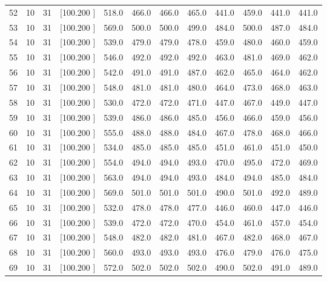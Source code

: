 \documentclass[12pt,a4paper]{article}
\begin{document}
\begin{center}
{\begin{tabular}{r r r r r r r r r r r r}
  52& 10& 31&[100.200   ]&   518.0&   466.0&   466.0&   465.0&   441.0&   459.0&   441.0&   441.0\\[-0.02in]
  53& 10& 31&[100.200   ]&   569.0&   500.0&   500.0&   499.0&   484.0&   500.0&   487.0&   484.0\\[-0.02in]
  54& 10& 31&[100.200   ]&   539.0&   479.0&   479.0&   478.0&   459.0&   480.0&   460.0&   459.0\\[-0.02in]
  55& 10& 31&[100.200   ]&   546.0&   492.0&   492.0&   492.0&   463.0&   481.0&   469.0&   462.0\\[-0.02in]
  56& 10& 31&[100.200   ]&   542.0&   491.0&   491.0&   487.0&   462.0&   465.0&   464.0&   462.0\\[-0.02in]
  57& 10& 31&[100.200   ]&   548.0&   481.0&   481.0&   480.0&   464.0&   473.0&   468.0&   463.0\\[-0.02in]
  58& 10& 31&[100.200   ]&   530.0&   472.0&   472.0&   471.0&   447.0&   467.0&   449.0&   447.0\\[-0.02in]
  59& 10& 31&[100.200   ]&   539.0&   486.0&   486.0&   485.0&   456.0&   466.0&   459.0&   456.0\\[-0.02in]
  60& 10& 31&[100.200   ]&   555.0&   488.0&   488.0&   484.0&   467.0&   478.0&   468.0&   466.0\\[-0.02in]
  61& 10& 31&[100.200   ]&   534.0&   485.0&   485.0&   485.0&   451.0&   461.0&   451.0&   450.0\\[-0.02in]
  62& 10& 31&[100.200   ]&   554.0&   494.0&   494.0&   493.0&   470.0&   495.0&   472.0&   469.0\\[-0.02in]
  63& 10& 31&[100.200   ]&   563.0&   494.0&   494.0&   493.0&   484.0&   494.0&   485.0&   484.0\\[-0.02in]
  64& 10& 31&[100.200   ]&   569.0&   501.0&   501.0&   501.0&   490.0&   501.0&   492.0&   489.0\\[-0.02in]
  65& 10& 31&[100.200   ]&   532.0&   478.0&   478.0&   477.0&   446.0&   460.0&   447.0&   446.0\\[-0.02in]
  66& 10& 31&[100.200   ]&   539.0&   472.0&   472.0&   470.0&   454.0&   461.0&   457.0&   454.0\\[-0.02in]
  67& 10& 31&[100.200   ]&   548.0&   482.0&   482.0&   481.0&   467.0&   482.0&   468.0&   467.0\\[-0.02in]
  68& 10& 31&[100.200   ]&   560.0&   493.0&   493.0&   493.0&   476.0&   479.0&   476.0&   475.0\\[-0.02in]
  69& 10& 31&[100.200   ]&   572.0&   502.0&   502.0&   502.0&   490.0&   502.0&   491.0&   489.0\\[-0.02in]

\end{tabular}}
\end{center}
\end{document}
